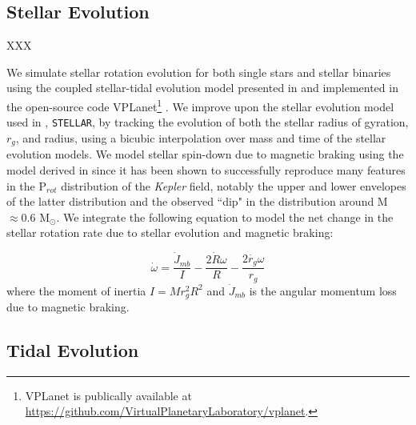 \documentclass[twocolumn]{aastex61}
\newcommand{\stellar}[0]{\texttt{STELLAR}\xspace}
\begin{document}
\subsection{Stellar Evolution} \label{sec:methods:stellar}

XXX

We simulate stellar rotation evolution for both single stars and stellar binaries using the coupled stellar-tidal evolution model presented in \citet{Fleming2018} and implemented in the open-source code VPLanet\footnote{VPLanet is publically available
at \href{https://github.com/VirtualPlanetaryLaboratory/vplanet}{{https://github.com/VirtualPlanetaryLaboratory/vplanet}}.} \citep[][Barnes et al., in prep]{Barnes2016,vplanet2018}. We improve upon the stellar evolution model used in \citet{Fleming2018}, \stellar, by tracking the evolution of both the stellar radius of gyration, $r_g$, and radius, using a bicubic interpolation over mass and time of the \citet{Baraffe2015} stellar evolution models. We model stellar spin-down due to magnetic braking using the model derived in \citet{Matt2015} since it has been shown to successfully reproduce many features in the P$_{rot}$ distribution of the \textit{Kepler} field, notably the upper and lower envelopes of the latter distribution and the observed ``dip" in the distribution around M${\approx}0.6$ M$_{\odot}$. We integrate the following equation to model the net change in the stellar rotation rate due to stellar evolution and magnetic braking: 

\begin{equation} \label{eqn:stellar_rot_rate_dt}
\dot{\omega} = \frac{\dot{J}_{mb}}{I} - \frac{2 \dot{R} \omega}{R} - \frac{2 \dot{r_g} \omega}{r_g}
\end{equation}
where the moment of inertia $I = M r_g^2 R^2$ and $\dot{J}_{mb}$ is the angular momentum loss due to magnetic braking.  

\subsection{Tidal Evolution} \label{sec:methods:eqtide}
\end{document}
